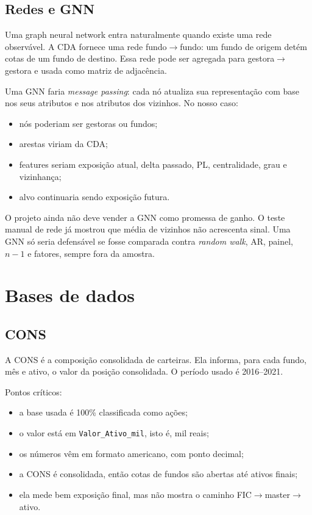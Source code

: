 \documentclass[11pt,a4paper]{article}
\begin{document}
\subsection{Redes e GNN}

Uma graph neural network entra naturalmente quando existe uma rede observável. A CDA fornece uma rede
fundo$\to$fundo: um fundo de origem detém cotas de um fundo de destino. Essa rede pode ser agregada para
gestora$\to$gestora e usada como matriz de adjacência.

Uma GNN faria \emph{message passing}: cada nó atualiza sua representação com base nos seus atributos e nos
atributos dos vizinhos. No nosso caso:
\begin{itemize}
\item nós poderiam ser gestoras ou fundos;
\item arestas viriam da CDA;
\item features seriam exposição atual, delta passado, PL, centralidade, grau e vizinhança;
\item alvo continuaria sendo exposição futura.
\end{itemize}

O projeto ainda não deve vender a GNN como promessa de ganho. O teste manual de rede já mostrou que média de
vizinhos não acrescenta sinal. Uma GNN só seria defensável se fosse comparada contra \emph{random walk}, AR,
painel, $n-1$ e fatores, sempre fora da amostra.

\section{Bases de dados}

\subsection{CONS}

A CONS é a composição consolidada de carteiras. Ela informa, para cada fundo, mês e ativo, o valor da posição
consolidada. O período usado é 2016--2021.

Pontos críticos:
\begin{itemize}
\item a base usada é 100\% classificada como ações;
\item o valor está em \texttt{Valor\_Ativo\_mil}, isto é, mil reais;
\item os números vêm em formato americano, com ponto decimal;
\item a CONS é consolidada, então cotas de fundos são abertas até ativos finais;
\item ela mede bem exposição final, mas não mostra o caminho FIC$\to$master$\to$ativo.
\end{itemize}
\end{document}
